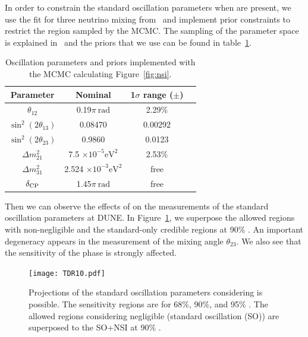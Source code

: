 In order to constrain the standard oscillation parameters when   are %
present, we use the fit for three neutrino mixing from~\cite{Gonzalez-Garcia:2013usa} and implement prior constraints to restrict the region sampled by the MCMC. The sampling of the parameter space is explained in~\cite{Coloma:2015kiu} and the priors that we use can be found in table~\ref{tab:priors1}.
\begin{table}[htb]
\caption{Oscillation parameters and priors implemented with the MCMC calculating Figure~\ref{fig:nsi}.} \label{tab:priors1}
\begin{center}
\begin{tabular}{cccc}
\hline
\hline
Parameter&Nominal&1$\sigma$ range ($\pm$)\\ 
\hline
$\theta_{12}$ &0.19$\pi~\textrm{rad}$&2.29\%\\
$\sin^2(2\theta_{13})$ &0.08470&0.00292\\
$\sin^2(2\theta_{23})$ &0.9860&0.0123\\
$\Delta m^2_{21} $ &7.5 $\times10^{-5}\textrm{eV}^2$&2.53\%\\
$\Delta m^2_{31} $ &2.524 $\times10^{-3}\textrm{eV}^2$&free\\
$\delta_{\rm CP} $ &1.45$\pi~\textrm{rad}$&free\\
\hline 
\hline
\end{tabular}
\end{center}
\end{table}

Then we can observe the effects of   on the measurements of the standard oscillation parameters at DUNE. In Figure~\ref{fig:standar-nsi}, we superpose the allowed regions with non-negligible   and the standard-only credible regions at 90\% . %
An important degeneracy appears in the measurement of the mixing angle $\theta_{23}$. We also see that the sensitivity of the  phase is strongly affected.
\begin{figure}[!htb]
	\centering
    \texttt{[image: TDR10.pdf]}
   \caption[Projections of the standard oscillation parameters considering  NSI is possible]{\label{fig:standar-nsi}Projections of the standard oscillation parameters considering   is possible. The sensitivity regions are for 68\%, 90\%, and 95\% . The allowed regions considering negligible   (standard oscillation (SO)) are superposed to the SO+NSI at 90\% .}
\end{figure}

